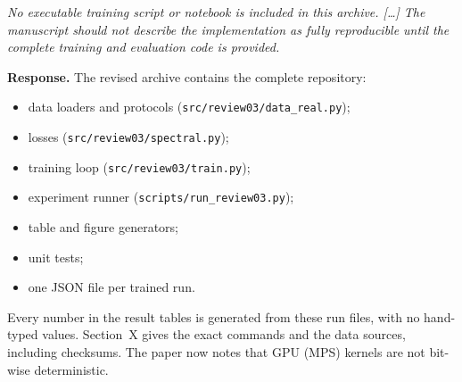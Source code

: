 \documentclass[11pt]{article}
\newenvironment{comment}{\par\medskip\noindent\begin{minipage}{\linewidth}\itshape\color{black!70}}{\end{minipage}\par\smallskip}
\begin{document}
\begin{comment}
No executable training script or notebook is included in this archive. [\dots]
The manuscript should not describe the implementation as fully reproducible
until the complete training and evaluation code is provided.
\end{comment}
\textbf{Response.} The revised archive contains the complete repository:
\begin{itemize}[leftmargin=*]
\item data loaders and protocols (\texttt{src/review03/data\_real.py});
\item losses (\texttt{src/review03/spectral.py});
\item training loop (\texttt{src/review03/train.py});
\item experiment runner (\texttt{scripts/run\_review03.py});
\item table and figure generators;
\item unit tests;
\item one JSON file per trained run.
\end{itemize}
Every number in the result tables is generated from these run files, with no
hand-typed values. Section~X gives the exact commands and the data sources,
including checksums. The paper now notes that GPU (MPS) kernels are not bit-wise
deterministic.

\end{document}
